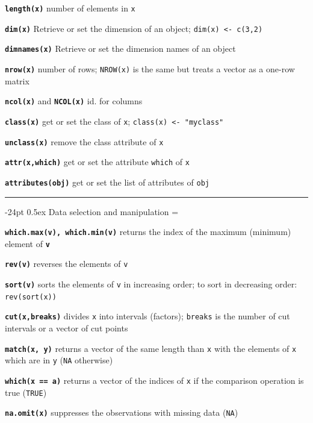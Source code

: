 \documentclass[8pt,landscape]{article}
\makeatletter
\renewcommand\section{\@startsection{section}{1}{0mm}%
                                     {-24pt}%
                                     {0.5ex}%
                                {\color{blue}\normalfont\large\bfseries}}
\newcommand{\code}{\texttt}
\newcommand{\bcode}[1]{\texttt{\textbf{#1}}}
\newcommand\T{\code{TRUE}}
\makeatother
\begin{document}
\begin{multicols*}{3}
\bcode{length(x)}  number of elements in \code{x}

\bcode{dim(x)} Retrieve or set the dimension of an object;
\code{dim(x) <- c(3,2)}

\bcode{dimnames(x)} Retrieve or set the dimension names of an object

\bcode{nrow(x)} number of rows; \code{NROW(x)} is the same but treats
a vector as a one-row matrix

\bcode{ncol(x)} and \bcode{NCOL(x)} id. for columns

\bcode{class(x)} get or set the class of \code{x}; \code{class(x) <- "myclass"}

\bcode{unclass(x)} remove the class attribute of \code{x}

\bcode{attr(x,which)} get or set the attribute \code{which} of \code{x}

\bcode{attributes(obj)} get or set the list of attributes of \code{obj}



\bigskip

\rule{.3\textwidth}{0.4pt}


\section{Data selection and manipulation}
\everypar={\hangindent=9mm}

\bcode{which.max(v), which.min(v)}  returns the index of the maximum (minimum) element of
\bcode{v}

\bcode{rev(v)}  reverses the elements of \code{v}

\bcode{sort(v)}  sorts the elements of \code{v} in increasing order; to sort in decreasing order: \code{rev(sort(x))}

\bcode{cut(x,breaks)}  divides \code{x} into intervals (factors);
\code{breaks} is the number of cut intervals or a vector of cut points

\bcode{match(x, y)}  returns a vector of the same length than \code{x} with the elements of \code{x} which are in \code{y} (\code{NA} otherwise)

\bcode{which(x == a)}  returns a vector of the indices of \code{x} if the comparison operation is true (\T)%

\bcode{na.omit(x)}  suppresses the observations with missing data (\code{NA}) %


\end{multicols*}
\end{document}
